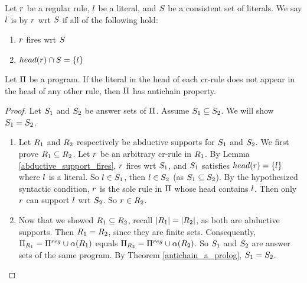 \documentclass{paper}
\begin{document}
\begin{flushleft}
\begin{definition}
\end{definition}

\begin{definition}

Let $r$ be a regular rule,
$l$ be a literal,
and $S$ be a consistent set of literals.
We say $l$ is  by $r$ wrt $S$
if all of the following hold:
\begin{enumerate}
\item
$r$ fires wrt $S$
\item
$head(r) \cap S = \{l\}$
\end{enumerate}
\cite[page 43, Proposition 2.2.1]{krb}

\end{definition}

\begin{proposition}
\label{unique_cr_literals}

Let $\Pi$ be a \cp{} program.
If the literal in the head of each cr-rule does not appear
in the head of any other rule,
then $\Pi$ has antichain property.

\end{proposition}

\begin{proof}

Let ${S}_{1}$ and ${S}_{2}$ be answer sets of $\Pi$.
Assume ${S}_{1} \subseteq {S}_{2}$.
We will show ${S}_{1} = {S}_{2}$.

\begin{enumerate}

\item
Let ${R}_{1}$ and ${R}_{2}$ respectively be abductive
supports for ${S}_{1}$ and ${S}_{2}$.
We first prove ${R}_{1} \subseteq {R}_{2}$.
Let $r$ be an arbitrary cr-rule in ${R}_{1}$.
By Lemma \ref{abductive_support_fires},
$r$ fires wrt ${S}_{1}$, and
${S}_{1}$ satisfies $head(r) = \{l\}$
where $l$ is a literal.
So $l \in {S}_{1}$, then $l \in {S}_{2}$
(as ${S}_{1} \subseteq {S}_{2}$).
By the hypothesized syntactic condition, $r$ is the sole
rule in $\Pi$ whose head contains $l$.
Then only $r$ can support $l$ wrt ${S}_{2}$.
So $r \in {R}_{2}$.

\item
Now that we showed ${R}_{1} \subseteq {R}_{2}$,
recall $|{R}_{1}| = |{R}_{2}|$,
as both are abductive supports.
Then ${R}_{1} = {R}_{2}$, since they are finite sets.
Consequently, $\Pi_{{R}_{1}} = \Pi^{reg} \cup \alpha({R}_{1})$ equals $\Pi_{{R}_{2}} = \Pi^{reg} \cup \alpha({R}_{2})$.
So ${S}_{1}$ and ${S}_{2}$ are answer sets of the same
\ap{} program.
By Theorem \ref{antichain_a_prolog}, ${S}_{1} = {S}_{2}$.


\end{enumerate}
\end{proof}
\end{flushleft}
\end{document}
